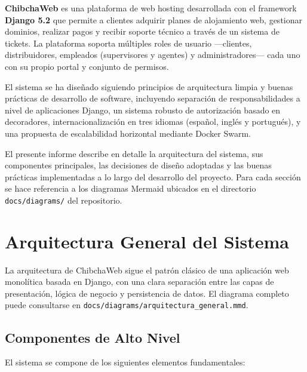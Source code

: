 \documentclass[12pt, a4paper]{article}
\begin{document}
\textbf{ChibchaWeb} es una plataforma de web hosting desarrollada con el framework \textbf{Django 5.2} que permite a clientes adquirir planes de alojamiento web, gestionar dominios, realizar pagos y recibir soporte técnico a través de un sistema de tickets. La plataforma soporta múltiples roles de usuario ---clientes, distribuidores, empleados (supervisores y agentes) y administradores--- cada uno con su propio portal y conjunto de permisos.

El sistema se ha diseñado siguiendo principios de arquitectura limpia y buenas prácticas de desarrollo de software, incluyendo separación de responsabilidades a nivel de aplicaciones Django, un sistema robusto de autorización basado en decoradores, internacionalización en tres idiomas (español, inglés y portugués), y una propuesta de escalabilidad horizontal mediante Docker Swarm.

El presente informe describe en detalle la arquitectura del sistema, sus componentes principales, las decisiones de diseño adoptadas y las buenas prácticas implementadas a lo largo del desarrollo del proyecto. Para cada sección se hace referencia a los diagramas Mermaid ubicados en el directorio \texttt{docs/diagrams/} del repositorio.

\section{Arquitectura General del Sistema}
\label{sec:arq-general}

La arquitectura de ChibchaWeb sigue el patrón clásico de una aplicación web monolítica basada en Django, con una clara separación entre las capas de presentación, lógica de negocio y persistencia de datos. El diagrama completo puede consultarse en \texttt{docs/diagrams/arquitectura\_general.mmd}.

\subsection{Componentes de Alto Nivel}

El sistema se compone de los siguientes elementos fundamentales:
\end{document}
